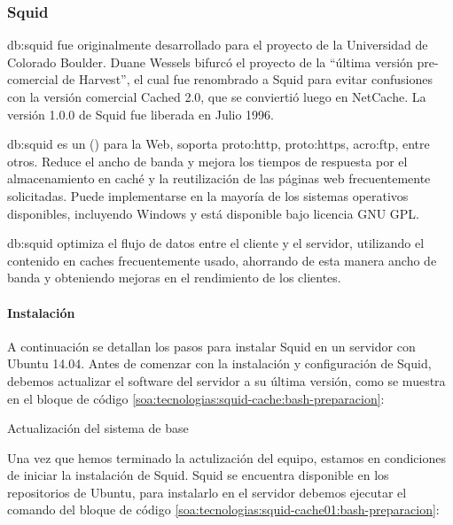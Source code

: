 \subsubsection{Squid}
\label{soa:tecnologias:squid}

\gls{db:squid} fue originalmente desarrollado para el proyecto  de la Universidad de Colorado Boulder.  Duane Wessels bifurcó el proyecto de la ``última versión pre-comercial de Harvest'', el cual fue renombrado a Squid para evitar confusiones con la versión comercial Cached 2.0, que se conviertió luego en NetCache.  La versión 1.0.0 de Squid fue liberada en Julio 1996.

\gls{db:squid} es un  () para la Web, soporta \gls{proto:http}, \gls{proto:https}, \gls{acro:ftp}, entre otros. Reduce el ancho de banda y mejora los tiempos de respuesta por el almacenamiento en caché y la reutilización de las páginas web frecuentemente solicitadas.  Puede implementarse en la mayoría de los sistemas operativos disponibles, incluyendo Windows y está disponible bajo licencia GNU GPL.

\gls{db:squid} optimiza el flujo de datos entre el cliente y el servidor, utilizando el contenido en caches frecuentemente usado, ahorrando de esta manera ancho de banda y obteniendo mejoras en el rendimiento de los clientes.

\paragraph{Instalación}

A continuación se detallan los pasos para instalar Squid en un servidor con Ubuntu 14.04.  Antes de comenzar con la instalación y configuración de Squid, debemos actualizar el software del servidor a su última versión, como se muestra en el bloque de código \autoref{soa:tecnologias:squid-cache:bash-preparacion}:

\begin{listing}[H]
  \caption{Actualización del sistema de base}
  \label{soa:tecnologias:squid-cache:bash-preparacion}
\end{listing}

Una vez que hemos terminado la actulización del equipo, estamos en condiciones de iniciar la instalación de Squid.  Squid se encuentra disponible en los repositorios de Ubuntu, para instalarlo en el servidor debemos ejecutar el comando del bloque de código \autoref{soa:tecnologias:squid-cache01:bash-preparacion}:

